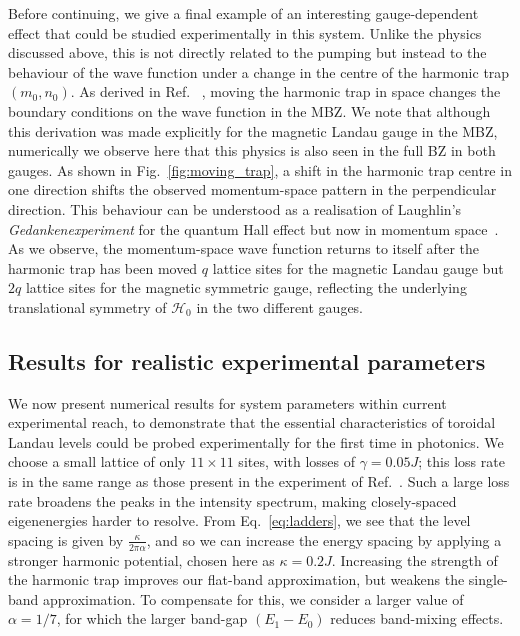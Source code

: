 Before continuing, we give a final example of an interesting
gauge-dependent effect that could be studied experimentally in this
system. Unlike the physics discussed above, this is not directly
related to the pumping but instead to the behaviour of the wave
function under a change in the centre of the harmonic trap $(m_0,
n_0)$. As derived in Ref. ~\cite{ozawa2014momhh}, moving the harmonic
trap in space changes the boundary conditions on the wave function in
the MBZ. We note that although this derivation was made explicitly for
the magnetic Landau gauge in the MBZ, numerically we observe here that
this physics is also seen in the full BZ in both gauges.  As shown
in Fig.~\ref{fig:moving_trap}, a shift in the harmonic trap centre in
one direction shifts the observed momentum-space pattern in the
perpendicular direction. This behaviour can be understood as a
realisation of Laughlin's {\em Gedankenexperiment} for the quantum
Hall effect but now in momentum space~\cite{ozawa2014momhh}. As we
observe, the momentum-space wave function returns to itself after the
harmonic trap has been moved $q$ lattice sites for the magnetic Landau
gauge but $2q$ lattice sites for the magnetic symmetric gauge,
reflecting the underlying translational symmetry of $\mathcal{H}_0$ in
the two different gauges.


\subsection{Results for realistic experimental parameters}
\label{sec:experiment}

We now present numerical results for system parameters within current
experimental reach, to demonstrate that the essential characteristics
of toroidal Landau levels could be probed experimentally for the first
time in photonics. We choose a small lattice of only $11 \times 11$
sites, with losses of $\gamma = 0.05 J$; this loss rate is in the same
range as those present in the experiment of
Ref.~\cite{hafezi2013imaging}. Such a large loss rate broadens the
peaks in the intensity spectrum, making closely-spaced eigenenergies
harder to resolve. From Eq.~\eqref{eq:ladders}, we see that the level
spacing is given by $\frac{\kappa}{2\pi\alpha}$, and so we can
increase the energy spacing by applying a stronger harmonic potential,
chosen here as $\kappa = 0.2 J$. Increasing the strength of the
harmonic trap improves our flat-band approximation, but weakens the
single-band approximation. To compensate for this, we consider a
larger value of $\alpha = 1/7$, for which the larger band-gap $(E_1 -
E_0)$ reduces band-mixing effects.

